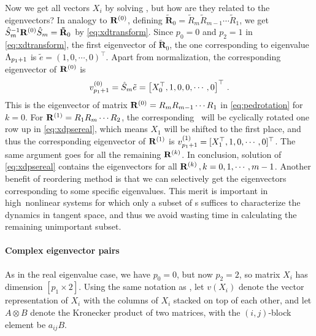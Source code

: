 Now we get all vectors $X_{i}$ by solving \pse, but how are they related
to the eigenvectors? In analogy to $\mathbf{R}^{(0)}$, defining
$\mathbf{\tilde{R}}_{0}=\tilde{R}_{m}\tilde{R}_{m-1}\cdots
\tilde{R}_{1}$, we get
$\hat{S}_{m}^{-1}\mathbf{R}^{(0)}\hat{S}_{m}=\mathbf{\tilde{R}}_{0}$ by
\eqref{eq:xdtransform}. Since $p_{0}=0$ and $p_{2}=1$ in
\eqref{eq:xdtransform}, the first eigenvector of
$\mathbf{\tilde{R}}_{0}$, the one corresponding to eigenvalue
$\Lambda_{p_1+1}$
is $\tilde{e}=(1,0,\cdots , 0)^\top $. Apart from
normalization, the corresponding eigenvector of $\mathbf{R}^{(0)}$ is
\[
  v_{p_{1}+1}^{(0)}=\hat{S}_{m}\tilde{e}
  = \left[X_{0}^\top , 1, 0, 0, \cdots, 0 \right]^\top
  \,.
\]
This is the eigenvector of matrix $\mathbf{R}^{(0)}=R_{m}R_{m-1}\cdots R_{1}$ in
\eqref{eq:pedrotation} for $k=0$. For $\mathbf{R}^{(1)}=R_{1}R_{m}\cdots R_{2}$,
the corresponding \pse\ will be cyclically rotated one row up {in
  \eqref{eq:xdpsereal}, which means $X_{1}$ will be shifted to the first
  place, and thus the corresponding eigenvector of}
$\mathbf{R}^{(1)}$ is $v_{p_{1}+1}^{(1)}=[X_{1}^\top,1,0,\cdots,0]^\top $. The
same argument goes for all the {remaining $\mathbf{R}^{(k)}$.}
In conclusion, solution of \eqref{eq:xdpsereal} contains the eigenvectors
for all $\mathbf{R}^{(k)}\,,k=0,1,\cdots,m-1$.
Another benefit of reordering method is that we can selectively
get the eigenvectors corresponding to some specific eigenvalues.
This merit is important in high\dmn\ nonlinear systems for
which only a subset of \Fv s suffices to characterize the
dynamics in tangent space, and thus we avoid wasting time in calculating
{the remaining unimportant subset}.

\paragraph{Complex eigenvector pairs}
As in the real eigenvalue case, we have $p_{0}=0$, but now $p_{2}=2$, so
matrix $X_{i}$  has dimension $[p_{1}\!\times\! 2]$. Using the same
notation as , let $v(X_{i})$ denote the vector
representation of $X_{i}$ with the columns of $X_{i}$ stacked on top of
each other, and let $A\otimes B$ denote the Kronecker product of two
matrices, with the $(i,j)$-block element be $a_{ij}B$.

